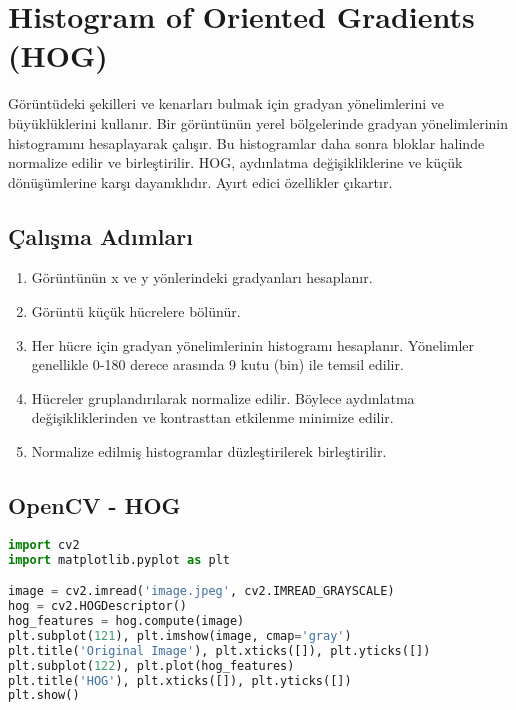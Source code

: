 \section{Histogram of Oriented Gradients (HOG)}

Görüntüdeki şekilleri ve kenarları bulmak için gradyan yönelimlerini ve büyüklüklerini kullanır. Bir görüntünün yerel bölgelerinde gradyan yönelimlerinin histogramını hesaplayarak çalışır. Bu histogramlar daha sonra bloklar halinde normalize edilir ve birleştirilir. HOG, aydınlatma değişikliklerine ve küçük dönüşümlerine karşı dayanıklıdır. Ayırt edici özellikler çıkartır. 

\subsection{Çalışma Adımları}
\begin{enumerate}
	\item Görüntünün x ve y yönlerindeki gradyanları hesaplanır.
	\item Görüntü küçük hücrelere bölünür.
	\item Her hücre için gradyan yönelimlerinin histogramı hesaplanır. Yönelimler genellikle 0-180 derece arasında 9 kutu (bin) ile temsil edilir.
	\item Hücreler gruplandırılarak normalize edilir. Böylece aydınlatma değişikliklerinden ve kontrasttan etkilenme minimize edilir.
	\item Normalize edilmiş histogramlar düzleştirilerek birleştirilir.
\end{enumerate}

\subsection{OpenCV - HOG}
\begin{lstlisting}[language=Python]
import cv2
import matplotlib.pyplot as plt

image = cv2.imread('image.jpeg', cv2.IMREAD_GRAYSCALE)
hog = cv2.HOGDescriptor()
hog_features = hog.compute(image)
plt.subplot(121), plt.imshow(image, cmap='gray')
plt.title('Original Image'), plt.xticks([]), plt.yticks([])
plt.subplot(122), plt.plot(hog_features)
plt.title('HOG'), plt.xticks([]), plt.yticks([])
plt.show()
\end{lstlisting}

\newpage